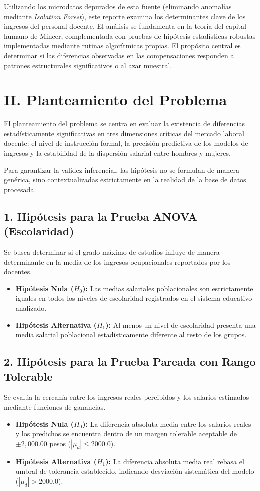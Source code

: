 \documentclass[10pt,twocolumn,a4paper]{article}
\begin{document}
Utilizando los microdatos depurados de esta fuente (eliminando anomalías mediante \textit{Isolation Forest}), este reporte examina los determinantes clave de los ingresos del personal docente. El análisis se fundamenta en la teoría del capital humano de Mincer, complementada con pruebas de hipótesis estadísticas robustas implementadas mediante rutinas algorítmicas propias. El propósito central es determinar si las diferencias observadas en las compensaciones responden a patrones estructurales significativos o al azar muestral.

\section{II. Planteamiento del Problema}
El planteamiento del problema se centra en evaluar la existencia de diferencias estadísticamente significativas en tres dimensiones críticas del mercado laboral docente: el nivel de instrucción formal, la precisión predictiva de los modelos de ingresos y la estabilidad de la dispersión salarial entre hombres y mujeres.

Para garantizar la validez inferencial, las hipótesis no se formulan de manera genérica, sino contextualizadas estrictamente en la realidad de la base de datos procesada.

\subsection{1. Hipótesis para la Prueba ANOVA (Escolaridad)}
Se busca determinar si el grado máximo de estudios influye de manera determinante en la media de los ingresos ocupacionales reportados por los docentes.
\begin{itemize}
    \item \textbf{Hipótesis Nula ($H_0$):} Las medias salariales poblacionales son estrictamente iguales en todos los niveles de escolaridad registrados en el sistema educativo analizado.
    \item \textbf{Hipótesis Alternativa ($H_1$):} Al menos un nivel de escolaridad presenta una media salarial poblacional estadísticamente diferente al resto de los grupos.
\end{itemize}

\subsection{2. Hipótesis para la Prueba Pareada con Rango Tolerable}
Se evalúa la cercanía entre los ingresos reales percibidos y los salarios estimados mediante funciones de ganancias.
\begin{itemize}
    \item \textbf{Hipótesis Nula ($H_0$):} La diferencia absoluta media entre los salarios reales y los predichos se encuentra dentro de un margen tolerable aceptable de $\pm 2,000.00$ pesos ($|\mu_d| \le 2000.0$).
    \item \textbf{Hipótesis Alternativa ($H_1$):} La diferencia absoluta media real rebasa el umbral de tolerancia establecido, indicando desviación sistemática del modelo ($|\mu_d| > 2000.0$).
\end{itemize}
\end{document}
